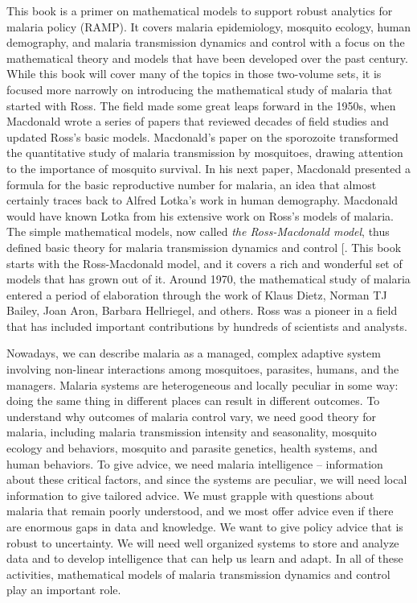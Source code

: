 \documentclass[
]{book}
\begin{document}
This book is a primer on mathematical models to support robust analytics for malaria policy (RAMP).
It covers malaria epidemiology, mosquito ecology, human demography, and malaria transmission dynamics and control with a focus on the mathematical theory and models that have been developed over the past century.
While this book will cover many of the topics in those two-volume sets, it is focused more narrowly on introducing the mathematical study of malaria that started with Ross.
The field made some great leaps forward in the 1950s, when Macdonald wrote a series of papers that reviewed decades of field studies and updated Ross's basic models.
Macdonald's paper on the sporozoite transformed the quantitative study of malaria transmission by mosquitoes, drawing attention to the importance of mosquito survival.
In his next paper, Macdonald presented a formula for the basic reproductive number for malaria, an idea that almost certainly traces back to Alfred Lotka's work in human demography.
Macdonald would have known Lotka from his extensive work on Ross's models of malaria.
The simple mathematical models, now called \emph{the Ross-Macdonald model}, thus defined basic theory for malaria transmission dynamics and control {[}\citeproc{ref-SmithDL2012_RossMacdonald}{2}{]}.
This book starts with the Ross-Macdonald model, and it covers a rich and wonderful set of models that has grown out of it.
Around 1970, the mathematical study of malaria entered a period of elaboration through the work of Klaus Dietz, Norman TJ Bailey, Joan Aron, Barbara Hellriegel, and others.
Ross was a pioneer in a field that has included important contributions by hundreds of scientists and analysts.

Nowadays, we can describe malaria as a managed, complex adaptive system involving non-linear interactions among mosquitoes, parasites, humans, and the managers. Malaria systems are heterogeneous and locally peculiar in some way: doing the same thing in different places can result in different outcomes. To understand why outcomes of malaria control vary, we need good theory for malaria, including malaria transmission intensity and seasonality, mosquito ecology and behaviors, mosquito and parasite genetics, health systems, and human behaviors. To give advice, we need malaria intelligence -- information about these critical factors, and since the systems are peculiar, we will need local information to give tailored advice. We must grapple with questions about malaria that remain poorly understood, and we most offer advice even if there are enormous gaps in data and knowledge. We want to give policy advice that is robust to uncertainty. We will need well organized systems to store and analyze data and to develop intelligence that can help us learn and adapt. In all of these activities, mathematical models of malaria transmission dynamics and control play an important role.
\end{document}
